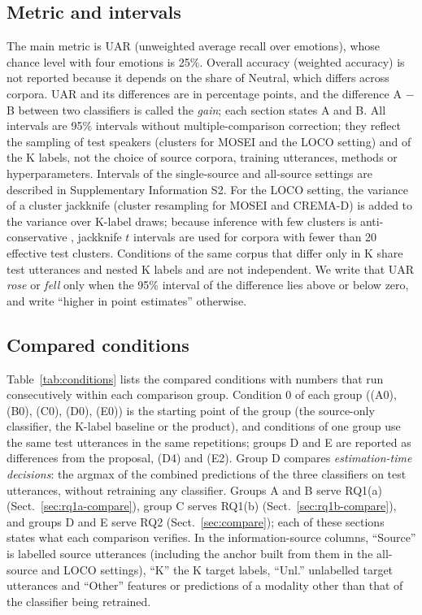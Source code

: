 \subsection{Metric and intervals}
The main metric is UAR (unweighted average recall over emotions), whose chance level with four emotions is 25\%. Overall accuracy (weighted accuracy) is not reported because it depends on the share of Neutral, which differs across corpora. UAR and its differences are in percentage points, and the difference A $-$ B between two classifiers is called the \emph{gain}; each section states A and B. All intervals are 95\% intervals without multiple-comparison correction; they reflect the sampling of test speakers (clusters for MOSEI and the LOCO setting) and of the K labels, not the choice of source corpora, training utterances, methods or hyperparameters. Intervals of the single-source and all-source settings are described in Supplementary Information S2. For the LOCO setting, the variance of a cluster jackknife (cluster resampling for MOSEI and CREMA-D) is added to the variance over K-label draws; because inference with few clusters is anti-conservative \cite{cameron2008}, jackknife $t$ intervals are used for corpora with fewer than 20 effective test clusters. Conditions of the same corpus that differ only in K share test utterances and nested K labels and are not independent. We write that UAR \emph{rose} or \emph{fell} only when the 95\% interval of the difference lies above or below zero, and write ``higher in point estimates'' otherwise.

\subsection{Compared conditions}\label{sec:conditions}
Table~\ref{tab:conditions} lists the compared conditions with numbers that run consecutively within each comparison group. Condition 0 of each group ((A0), (B0), (C0), (D0), (E0)) is the starting point of the group (the source-only classifier, the K-label baseline or the product), and conditions of one group use the same test utterances in the same repetitions; groups D and E are reported as differences from the proposal, (D4) and (E2). Group D compares \emph{estimation-time decisions}: the argmax of the combined predictions of the three classifiers on test utterances, without retraining any classifier. Groups A and B serve RQ1(a) (Sect.~\ref{sec:rq1a-compare}), group C serves RQ1(b) (Sect.~\ref{sec:rq1b-compare}), and groups D and E serve RQ2 (Sect.~\ref{sec:compare}); each of these sections states what each comparison verifies. In the information-source columns, ``Source'' is labelled source utterances (including the anchor built from them in the all-source and LOCO settings), ``K'' the K target labels, ``Unl.'' unlabelled target utterances and ``Other'' features or predictions of a modality other than that of the classifier being retrained.

